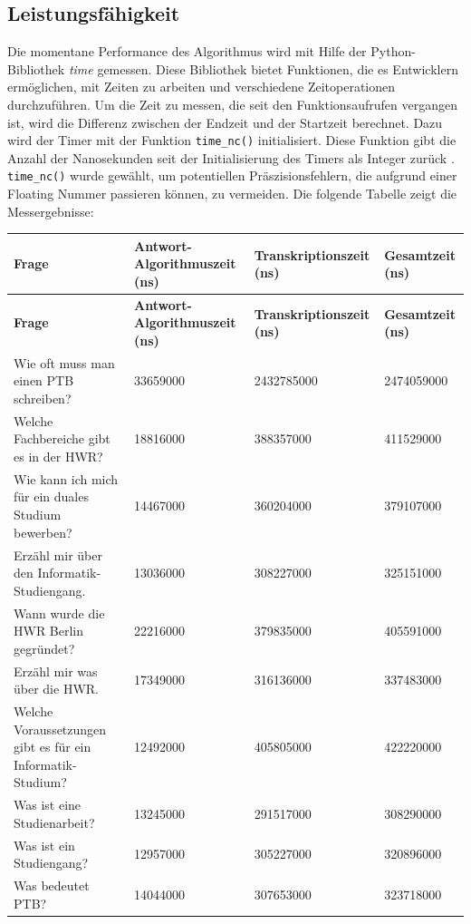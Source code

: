 \subsection{Leistungsfähigkeit}
Die momentane Performance des Algorithmus wird mit Hilfe der Python-Bibliothek \textit{time} gemessen. Diese Bibliothek bietet Funktionen, die es Entwicklern ermöglichen, mit Zeiten zu arbeiten und verschiedene Zeitoperationen durchzuführen. Um die Zeit zu messen, die seit den Funktionsaufrufen vergangen ist, wird die Differenz zwischen der Endzeit und der Startzeit berechnet. Dazu wird der Timer mit der Funktion \lstinline|time_nc()| initialisiert. Diese Funktion gibt die Anzahl der Nanosekunden seit der Initialisierung des Timers als Integer zurück \cite{pythonTimer}. \lstinline|time_nc()| wurde gewählt, um  potentiellen Präszisionsfehlern, die aufgrund einer Floating Nummer passieren können, zu vermeiden. Die folgende Tabelle zeigt die Messergebnisse: 
\begin{longtable}{|p{5cm}|p{3cm}|p{3.5cm}|p{3cm}|}
\hline
\textbf{Frage} & \textbf{Antwort-Algorithmuszeit (ns)} & \textbf{Transkriptionszeit (ns)} & \textbf{Gesamtzeit (ns)} \\
\hline
\endfirsthead

\hline
\textbf{Frage} & \textbf{Antwort-Algorithmuszeit (ns)} & \textbf{Transkriptionszeit (ns)} & \textbf{Gesamtzeit (ns)} \\
\hline
\endhead

\hline
\endfoot

Wie oft muss man einen PTB schreiben? & 33659000 & 2432785000 & 2474059000 \\
\hline
Welche Fachbereiche gibt es in der HWR? & 18816000 & 388357000 & 411529000 \\
\hline
Wie kann ich mich für ein duales Studium bewerben? & 14467000 & 360204000 & 379107000 \\
\hline
Erzähl mir über den Informatik-Studiengang. & 13036000 & 308227000 & 325151000 \\
\hline
Wann wurde die HWR Berlin gegründet? & 22216000 & 379835000 & 405591000 \\
\hline
Erzähl mir was über die HWR. & 17349000 & 316136000 & 337483000 \\
\hline
Welche Voraussetzungen gibt es für ein Informatik-Studium? & 12492000 & 405805000 & 422220000 \\
\hline
Was ist eine Studienarbeit? & 13245000 & 291517000 & 308290000 \\
\hline
Was ist ein Studiengang? & 12957000 & 305227000 & 320896000 \\
\hline
Was bedeutet PTB? & 14044000 & 307653000 & 323718000 \\
\hline

\end{longtable}

